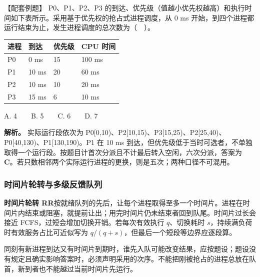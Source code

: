 \begin{example}[配套例题]

【配套例题】 P0、P1、P2、P3 的到达、优先级（值越小优先权越高）和执行时间如下表所示。采用基于优先权的抢占式进程调度，从 0 ms 开始，到四个进程都运行结束为止，发生进程调度的总次数为（　）。

\begin{wideblock}

\par\medskip\noindent\begin{minipage}{\linewidth}\fontsize{9.3}{12}\selectfont\begin{tabularx}{\linewidth}{@{}YYYY@{}}
\toprule\noalign{}
进程 & 到达 & 优先级 & CPU 时间 \\
\midrule\noalign{}


P0 & 0 ms & 15 & 100 ms \\
P1 & 10 ms & 20 & 60 ms \\
P2 & 10 ms & 10 & 20 ms \\
P3 & 15 ms & 6 & 10 ms \\
\bottomrule\end{tabularx}
\end{minipage}\par\medskip

\end{wideblock}

A. 4　　B. 5　　C. 6　　D. 7

\end{example}

\textbf{解析。} 实际运行段依次为 P0{[}0,10)、P2{[}10,15)、P3{[}15,25)、P2{[}25,40)、P0{[}40,130)、P1{[}130,190)。P1 在 10 ms 到达，但优先级低于当时可选者，不单独取得一个运行段。按题目计首次分派且不计最后转入空闲，六次分派，答案为 \textbf{C}。若只数相邻两个实际运行进程的更换，则是五次；两种口径不可混用。

\subsubsection{时间片轮转与多级反馈队列}\label{OS02-auto-3}

\textbf{时间片轮转 RR}按就绪队列的先后，让每个进程取得至多一个时间片。进程在时间片内结束或阻塞，就提前让出；用完时间片仍未结束者回到队尾。时间片过长会接近 FCFS，过短会增加切换开销。若每次有效执行 \(q\)、切换耗时 \(s\)，持续满负荷时有效服务占比可近似写为 \(q/(q+s)\)，但最后一个短段等边界应逐段算。

同刻有新进程到达又有时间片到期时，谁先入队可能改变结果，应按题设；题设没有规定且确实影响答案时，必须声明采用的次序。不能把刚被抢占的进程总放在队首，新到者也不能越过当前时间片先运行。

